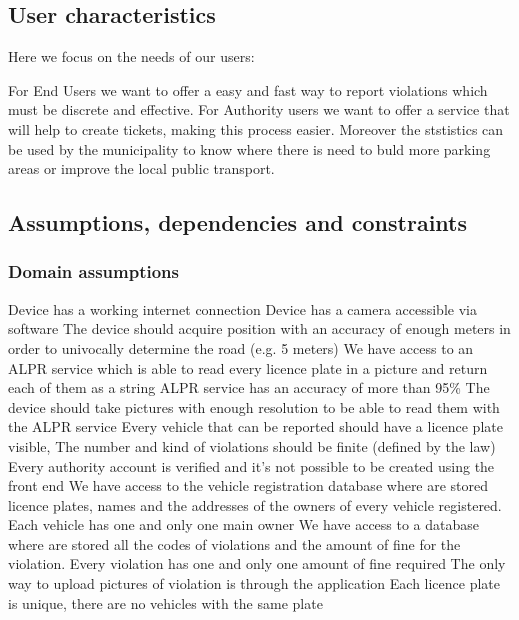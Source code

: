\subsection{User characteristics}
Here we focus on the needs of our users:

For End Users we want to offer a easy and fast way to report violations which must be discrete and effective.
For Authority users we want to offer a service that will help to create tickets, making this process easier. Moreover the ststistics can be used by the municipality to know where there is need to buld more parking areas or improve the local public transport.

\subsection{Assumptions, dependencies and constraints}
\subsubsection{Domain assumptions}

\begin{enumerate}
 Device has a working internet connection
 Device has a camera accessible via software
 The device should acquire position with an accuracy of enough meters in order to univocally determine the road (e.g. 5 meters)
 We have access to an ALPR service which is able to read every licence plate in a picture and return each of them as a string
 ALPR service has an accuracy of more than 95\%
 The device should take pictures with enough resolution to be able to read them with the ALPR service
 Every vehicle that can be reported should have a licence plate visible,
 The number and kind of violations should be finite (defined by the law)
 Every authority account is verified and it's not possible to be created using the front end
 We have access to the vehicle registration database where are stored licence plates, names and the addresses of the owners of every vehicle registered. Each vehicle has one and only one main owner
 We have access to a database where are stored all the codes of violations and the amount of fine for the violation. Every violation has one and only one amount of fine required
 The only way to upload pictures of violation is through the application
 Each licence plate is unique, there are no vehicles with the same plate

\end{enumerate}

